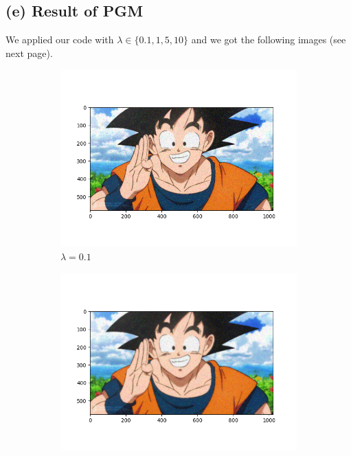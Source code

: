 \documentclass{article}
\begin{document}
\subsection*{(e) Result of PGM}
We applied our code with $\lambda \in \{0.1, 1, 5, 10\}$ and we got the following
images (see next page).
\begin{figure}[h]
  \centering
  \begin{subfigure}[b]{0.48\textwidth}
  \centering
  \includegraphics[width=\textwidth]{images/Goku_lambda_0_1.png}
  \caption{$\lambda = 0.1$}
  \label{fig:0.1}
  \end{subfigure}
  \hspace{0.02\textwidth}
  \begin{subfigure}[b]{0.48\textwidth}
  \centering
  \includegraphics[width=\textwidth]{images/Goku_lambda_1.png}

\end{subfigure}
\end{figure}
\end{document}
